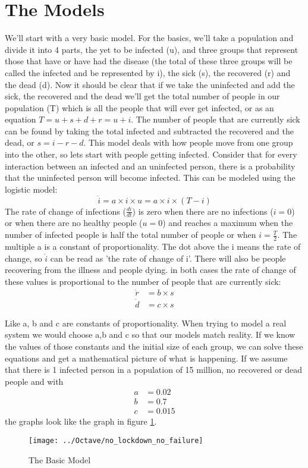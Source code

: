 \section{The Models}

We'll start with a very basic model. For the basics, we'll take a population and divide it into 4 parts, the yet to be infected (u), and three groups that represent those that have or have had the disease (the total of these three groups will be called the infected and be represented by i), the sick (s), the recovered (r) and the dead (d). Now it should be clear that if we take the uninfected and add the sick, the recovered and the dead we'll get the total number of people in our population (T) which is all the people that will ever get infected, or as an equation \(T=u+s+d+r=u+i\). The number of people that are currently sick can be found by taking the total infected and subtracted the recovered and the dead, or \(s = i-r-d\). This model deals with how people move from one group into the other, so lets start with people getting infected. Consider that for every interaction between an infected and an uninfected person, there is a probability that the uninfected person will become infected. This can be modeled using the logistic model: 
 \[
\dot{i}=a\times i\times u=a\times i\times (T-i)
\]
The rate of change of infections (\(\frac{di}{dt}\)) is zero when there are no infections (\(i=0\)) or when there are no healthy people (\(u=0\)) and reaches a maximum when the number of infected people is half the total number of people or when \(i = \frac{T}{2}\). The multiple a is a constant of proportionality. The dot above the i means the rate of change, so \(\dot{i}\) can be read as 'the rate of change of i'. There will also be people recovering from the illness and people dying. in both cases the rate of change of these values is proportional to the number of people that are currently sick:
\[
\begin{split}
\dot{r} &= b\times s\\
\dot{d} &= c\times s
\end{split}
\]

Like a, b and c are constants of proportionality. When trying to model a real system we would choose a,b and c so that our models match reality. If we know the values of those constants and the initial size of each group, we can solve these equations and get a mathematical picture of what is happening. If we assume that there is 1 infected person in a population of 15 million, no recovered or dead people and with \[
\begin{split}
a &= 0.02\\
b &= 0.7\\
c &= 0.015
\end{split}
\]
the graphs look like the graph in figure \ref{fig:nolockdownnofailure}.
\begin{figure}[H]
	\centering
	\texttt{[image: ../Octave/no\_lockdown\_no\_failure]}
	\caption[The Basic Model]{The Basic Model}
	\label{fig:nolockdownnofailure}
\end{figure}

